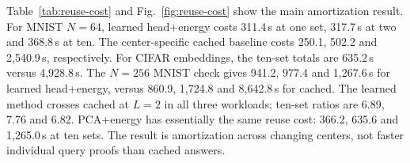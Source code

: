 \documentclass[5p,times,twocolumn]{elsarticle}
\theoremstyle{plain}
\theoremstyle{definition}
\theoremstyle{remark}
\begin{document}
\par\endgroup
\begingroup\color{RevisionGreen}
Table~\ref{tab:reuse-cost} and Fig.~\ref{fig:reuse-cost} show the main amortization result. For MNIST $N=64$, learned head+energy costs 311.4\,s at one set, 317.7\,s at two and 368.8\,s at ten. The center-specific cached baseline costs 250.1, 502.2 and 2,540.9\,s, respectively. For CIFAR embeddings, the ten-set totals are 635.2\,s versus 4,928.8\,s. The $N=256$ MNIST check gives 941.2, 977.4 and 1,267.6\,s for learned head+energy, versus 860.9, 1,724.8 and 8,642.8\,s for cached. The learned method crosses cached at $L=2$ in all three workloads; ten-set ratios are 6.89, 7.76 and 6.82. PCA+energy has essentially the same reuse cost: 366.2, 635.6 and 1,265.0\,s at ten sets. The result is amortization across changing centers, not faster individual query proofs than cached answers.
\end{document}
